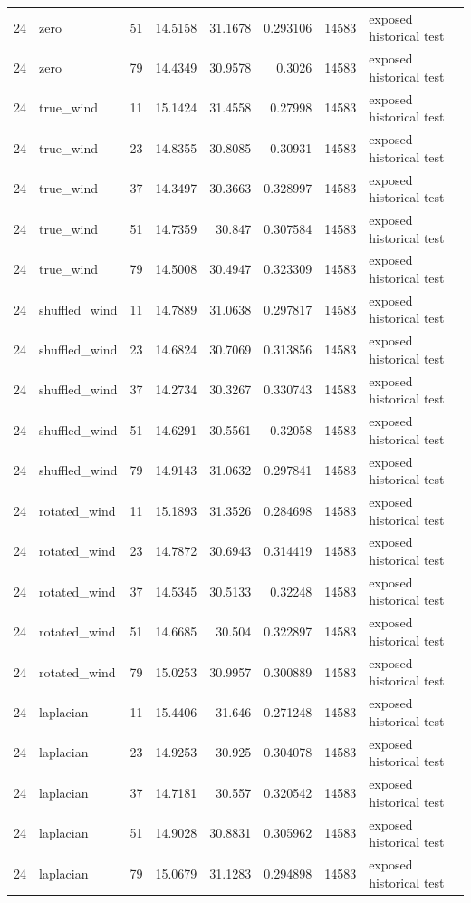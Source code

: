 \begin{tabular}{rllrrrrl}
24 & zero & 51 & 14.5158 & 31.1678 & 0.293106 & 14583 & exposed historical test \\
24 & zero & 79 & 14.4349 & 30.9578 & 0.3026 & 14583 & exposed historical test \\
24 & true\_wind & 11 & 15.1424 & 31.4558 & 0.27998 & 14583 & exposed historical test \\
24 & true\_wind & 23 & 14.8355 & 30.8085 & 0.30931 & 14583 & exposed historical test \\
24 & true\_wind & 37 & 14.3497 & 30.3663 & 0.328997 & 14583 & exposed historical test \\
24 & true\_wind & 51 & 14.7359 & 30.847 & 0.307584 & 14583 & exposed historical test \\
24 & true\_wind & 79 & 14.5008 & 30.4947 & 0.323309 & 14583 & exposed historical test \\
24 & shuffled\_wind & 11 & 14.7889 & 31.0638 & 0.297817 & 14583 & exposed historical test \\
24 & shuffled\_wind & 23 & 14.6824 & 30.7069 & 0.313856 & 14583 & exposed historical test \\
24 & shuffled\_wind & 37 & 14.2734 & 30.3267 & 0.330743 & 14583 & exposed historical test \\
24 & shuffled\_wind & 51 & 14.6291 & 30.5561 & 0.32058 & 14583 & exposed historical test \\
24 & shuffled\_wind & 79 & 14.9143 & 31.0632 & 0.297841 & 14583 & exposed historical test \\
24 & rotated\_wind & 11 & 15.1893 & 31.3526 & 0.284698 & 14583 & exposed historical test \\
24 & rotated\_wind & 23 & 14.7872 & 30.6943 & 0.314419 & 14583 & exposed historical test \\
24 & rotated\_wind & 37 & 14.5345 & 30.5133 & 0.32248 & 14583 & exposed historical test \\
24 & rotated\_wind & 51 & 14.6685 & 30.504 & 0.322897 & 14583 & exposed historical test \\
24 & rotated\_wind & 79 & 15.0253 & 30.9957 & 0.300889 & 14583 & exposed historical test \\
24 & laplacian & 11 & 15.4406 & 31.646 & 0.271248 & 14583 & exposed historical test \\
24 & laplacian & 23 & 14.9253 & 30.925 & 0.304078 & 14583 & exposed historical test \\
24 & laplacian & 37 & 14.7181 & 30.557 & 0.320542 & 14583 & exposed historical test \\
24 & laplacian & 51 & 14.9028 & 30.8831 & 0.305962 & 14583 & exposed historical test \\
24 & laplacian & 79 & 15.0679 & 31.1283 & 0.294898 & 14583 & exposed historical test \\
\hline
\end{tabular}
